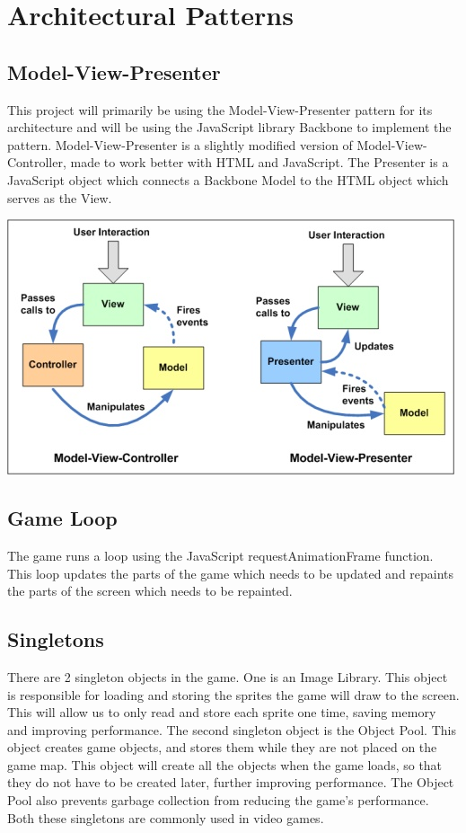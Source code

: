 \section{Architectural Patterns}

\subsection{Model-View-Presenter}
	This project will primarily be using the Model-View-Presenter pattern for its architecture and will 
	be using the JavaScript library Backbone to implement the pattern. Model-View-Presenter is a slightly
	modified version of Model-View-Controller, made to work better with HTML and JavaScript. The Presenter
	is a JavaScript object which connects a Backbone Model to the HTML object which serves as the View.

\includegraphics{pictures/mvc_mvp}

\subsection{Game Loop}
	The game runs a loop using the JavaScript requestAnimationFrame function. This loop updates the parts 
	of the game which needs to be updated and repaints the parts of the screen which needs to be repainted.

\subsection{Singletons}
	There are 2 singleton objects in the game. One is an Image Library. This object is responsible for 
	loading and storing the sprites the game will draw to the screen. This will allow us to only read and 
	store each sprite one time, saving memory and improving performance. The second singleton object is 
	the Object Pool. This object creates game objects, and stores them while they are not placed on the 
	game map. This object will create all the objects when the game loads, so that they do not have to 
	be created later, further improving performance. The Object Pool also prevents garbage collection 
	from reducing the game's performance. Both these singletons are commonly used in video games.
	
